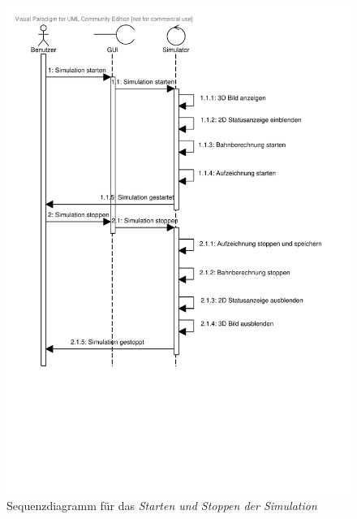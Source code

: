 \begin{figure}
\includegraphics[width=\linewidth]{bilder/Starten_Stoppen.pdf}
\caption{Sequenzdiagramm für das \textit{Starten und Stoppen der Simulation}}
\end{figure}

